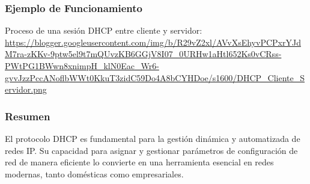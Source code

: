 \documentclass[a4paper,12pt]{article}
\begin{document}
\subsubsection*{Ejemplo de Funcionamiento}

Proceso de una sesión DHCP entre cliente y servidor: \url{https://blogger.googleusercontent.com/img/b/R29vZ2xl/AVvXsEhyvPCPxrYJdM7ra-zKKv-9ptw5el9t7mQUvzKB6GGjV8I07_0URHw1aHtl652Ks0vCRss-PWtPG1BWwn8xnimpH_klN0Eac_Wr6-gvvJzzPccANoflbWWt0KkuT3zidC59Do4A8bCYHDoe/s1600/DHCP_Cliente_Servidor.png}

\subsubsection*{Resumen}

El protocolo DHCP es fundamental para la gestión dinámica y automatizada de redes IP. Su capacidad para asignar y gestionar parámetros de configuración de red de manera eficiente lo convierte en una herramienta esencial en redes modernas, tanto domésticas como empresariales.











\end{document}
